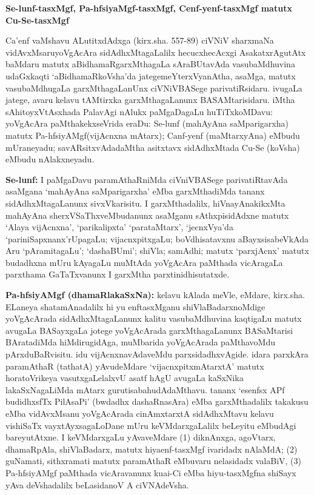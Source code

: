 \newpage

\begin{center}
{\textbf{\Large Se-lunf-tasxMgf, Pa-hfsiyaMgf-tasxMgf, Cenf-yenf-tasxMgf matutx Cu-Se-tasxMgf}}
\end{center}

Ca'enf vaMshavu ALutitxdAdxga (kirx.sha. 557-89) ciVNiV sharxmaNa vidAvxMsaru\break yoVgA\-cAra sidAdhxMtagaLalilx hecucxhecAcxgi AsakatxrAgutAtx baMdaru matutx aBidhamaR\break garxMthagaLa sAraBUtavAda vasubaMdhuvina udaGxkaqti `aBidhamaRkoVsha'da jatege\break meYterxVyanAtha, asaMga, matutx vasubaMdhugaLa garxMthagaLanUnx ciVNiVBASege parivatiR\-sidaru. ivugaLa jatege, avaru kelavu tAMtirxka garxMthagaLanunx BASAMtarisidaru. iMtha sAhitoyxVtAsxhada PalavAgi nAlukx paMgaDagaLu huTiTxkoMDavu: yoVgAcAra paMthakekx\break seVrida eraDu: Se-lunf (mahAyAna saMparigarxha) matutx Pa-hfsiyAMgf\break (vijAcnxna mAtarx); Canf-yenf (maMtarxyAna) eMbudu mUraneyadu; savARsitx\-vAdadaMtha asitxtavx sidAdhxMtada Cu-Se (koVsha) eMbudu nAlakxneyadu.

{\bf Se-lunf:} I paMgaDavu paramAthaRniMda ciVniVBASege parivatiRtavAda asaMgana `mahAyAna saMparigarxha' eMba garxMthadiMda tananx sidAdhxMtagaLanunx sivxVkarisitu. I garxMthadalilx, hiVnayAnakikxMta mahAyAna sherxVSaThxveMbudanunx asaMganu sAthxpisidAdxne matutx `Alaya vijAcnxna', `parikalipxta' `parataMtarx', `jecnxVya'da `pariniSapxnanx'rUpagaLu; vijacnxpitxgaLu; boVdhisatavxnu aBayxsisabeVkAda Aru `pAramitagaLu'; `dashaBUmi'; shiVla; samAdhi; matutx `parxjAcnx' matutx budadhxna mUru kAyagaLu muMtAda yoVgAcAra paMthada vicAragaLa parxthama GaTaTxvanunx I garxMtha parxtinidhisutatxde.

{\bf Pa-hfsiyAMgf (dhamaRlakaSxNa):} kelavu kAlada meVle, eMdare, kirx.sha. ELaneya shatamAnadalilx hi yu enftasxMganu shiVlaBadarxnoMdige yoVgAcArada sidAdhxMta\-gaLanunx kalitu vasubaMdhuvina kaqtigaLu matutx avugaLa BASayxgaLa jotege yoVgAcArada garxMthagaLanunx BASaMtarisi BAratadiMda hiMdirugidAga, muMbarida yoVgAcArada paMtha\-voMdu pArxduBaRvisitu. idu vijAcnxnavAdaveMdu parxsidadhxvAgide. idara parxkAra para\-mAthaR (tathatA) yAvudeMdare `vijacnxpitxmAtarxtA' matutx horatoVrikeya vasutx\-gaLelalxvU asatf hAgU avugaLa kaSxNika lakaSxNagaLiMda mAtarx gurutisabahudAdaMthavu. tananx `esenfsx APf budidhxsfTx PilAsaPi' (bwdadhx dashaRnasAra) eMba garxMthadalilx takakusu eMba vidAvxMsanu yoVgAcArada cinAmxtarxtA sidAdhxMtavu kelavu vishiSaTx vayxtAyxsagaLoDane mUru keVMdarxgaLalilx beLeyitu eMbudAgi bareyutAtxne. I keVMdarxgaLu yAvaveMdare
(1) diknAnxga, agoVtarx, dhamaRpAla, shiVlaBadarx, matutx hiya{e}nf-tasxMgf ivaridadx nAlaMdA;
(2) guNamati, sithxramati matutx paramAthaR eMbuvaru nelasidadx valaBiV,
(3) Pa-hfsiyAMgf paMthada vicAravanunx kuai-Ci eMba hiyu-tasxMgfna shiSayx yAva deVshadalilx beLasidanoV A ciVNAdeVsha.

